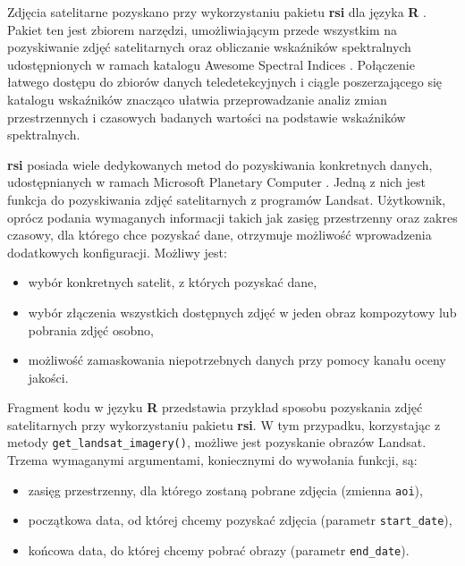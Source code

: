 \documentclass{amuthesis}
\begin{document}
Zdjęcia satelitarne pozyskano przy wykorzystaniu pakietu \textbf{rsi}
dla języka \textbf{R} \autocite{R-rsi}. Pakiet ten jest zbiorem
narzędzi, umożliwiającym przede wszystkim na pozyskiwanie zdjęć
satelitarnych oraz obliczanie wskaźników spektralnych udostępnionych w
ramach katalogu Awesome Spectral Indices
\autocite{montero2023standardized}. Połączenie łatwego dostępu do
zbiorów danych teledetekcyjnych i ciągle poszerzającego się katalogu
wskaźników znacząco ułatwia przeprowadzanie analiz zmian przestrzennych
i czasowych badanych wartości na podstawie wskaźników spektralnych.

\textbf{rsi} posiada wiele dedykowanych metod do pozyskiwania
konkretnych danych, udostępnianych w ramach Microsoft Planetary Computer
\autocite{microsoft_open_source_2022_7261897}. Jedną z nich jest funkcja
do pozyskiwania zdjęć satelitarnych z programów Landsat. Użytkownik,
oprócz podania wymaganych informacji takich jak zasięg przestrzenny oraz
zakres czasowy, dla którego chce pozyskać dane, otrzymuje możliwość
wprowadzenia dodatkowych konfiguracji. Możliwy jest:

\begin{itemize}
\tightlist
\item
  wybór konkretnych satelit, z których pozyskać dane,
\item
  wybór złączenia wszystkich dostępnych zdjęć w jeden obraz kompozytowy
  lub pobrania zdjęć osobno,
\item
  możliwość zamaskowania niepotrzebnych danych przy pomocy kanału oceny
  jakości.
\end{itemize}

Fragment kodu w języku \textbf{R} przedstawia przykład sposobu
pozyskania zdjęć satelitarnych przy wykorzystaniu pakietu \textbf{rsi}.
W tym przypadku, korzystając z metody \texttt{get\_landsat\_imagery()},
możliwe jest pozyskanie obrazów Landsat. Trzema wymaganymi argumentami,
koniecznymi do wywołania funkcji, są:

\begin{itemize}
\tightlist
\item
  zasięg przestrzenny, dla którego zostaną pobrane zdjęcia (zmienna
  \texttt{aoi}),
\item
  początkowa data, od której chcemy pozyskać zdjęcia (parametr
  \texttt{start\_date}),
\item
  końcowa data, do której chcemy pobrać obrazy (parametr
  \texttt{end\_date}).
\end{itemize}

\begin{Shaded}
\begin{Highlighting}[]
\SpecialCharTok{::}\NormalTok{(}
  \NormalTok{,}
  \NormalTok{,}
  \NormalTok{(}\NormalTok{, }\NormalTok{),}
  \NormalTok{,}
\NormalTok{)}
\end{Highlighting}
\end{Shaded}
\end{document}

